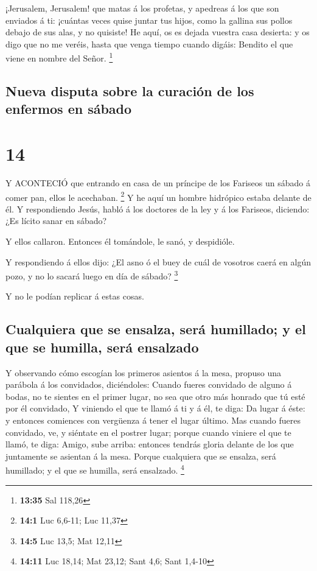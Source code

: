  ¡Jerusalem, Jerusalem! que matas á los profetas, y
apedreas á los que son enviados á ti: ¡cuántas veces quise juntar tus
hijos, como la gallina sus pollos debajo de sus alas, y no quisiste!
 He aquí, os es dejada vuestra casa desierta: y os digo que
no me veréis, hasta que venga tiempo cuando digáis: Bendito el que viene
en nombre del Señor. \footnote{\textbf{13:35} Sal 118,26}

\hypertarget{nueva-disputa-sobre-la-curaciuxf3n-de-los-enfermos-en-suxe1bado}{%
\subsection{Nueva disputa sobre la curación de los enfermos en
sábado}\label{nueva-disputa-sobre-la-curaciuxf3n-de-los-enfermos-en-suxe1bado}}

\hypertarget{section-13}{%
\section{14}\label{section-13}}

 Y ACONTECIÓ que entrando en casa de un príncipe de los
Fariseos un sábado á comer pan, ellos le acechaban. \footnote{\textbf{14:1}
  Luc 6,6-11; Luc 11,37}  Y he aquí un hombre hidrópico
estaba delante de él.  Y respondiendo Jesús, habló á los
doctores de la ley y á los Fariseos, diciendo: ¿Es lícito sanar en
sábado?

 Y ellos callaron. Entonces él tomándole, le sanó, y
despidióle.

 Y respondiendo á ellos dijo: ¿El asno ó el buey de cuál de
vosotros caerá en algún pozo, y no lo sacará luego en día de sábado?
\footnote{\textbf{14:5} Luc 13,5; Mat 12,11}

 Y no le podían replicar á estas cosas.

\hypertarget{cualquiera-que-se-ensalza-seruxe1-humillado-y-el-que-se-humilla-seruxe1-ensalzado}{%
\subsection{Cualquiera que se ensalza, será humillado; y el que se
humilla, será
ensalzado}\label{cualquiera-que-se-ensalza-seruxe1-humillado-y-el-que-se-humilla-seruxe1-ensalzado}}

 Y observando cómo escogían los primeros asientos á la mesa,
propuso una parábola á los convidados, diciéndoles:  Cuando
fueres convidado de alguno á bodas, no te sientes en el primer lugar, no
sea que otro más honrado que tú esté por él convidado,  Y
viniendo el que te llamó á ti y á él, te diga: Da lugar á éste: y
entonces comiences con vergüenza á tener el lugar último. 
Mas cuando fueres convidado, ve, y siéntate en el postrer lugar; porque
cuando viniere el que te llamó, te diga: Amigo, sube arriba: entonces
tendrás gloria delante de los que juntamente se asientan á la mesa.
 Porque cualquiera que se ensalza, será humillado; y el que
se humilla, será ensalzado. \footnote{\textbf{14:11} Luc 18,14; Mat
  23,12; Sant 4,6; Sant 1,4-10}

